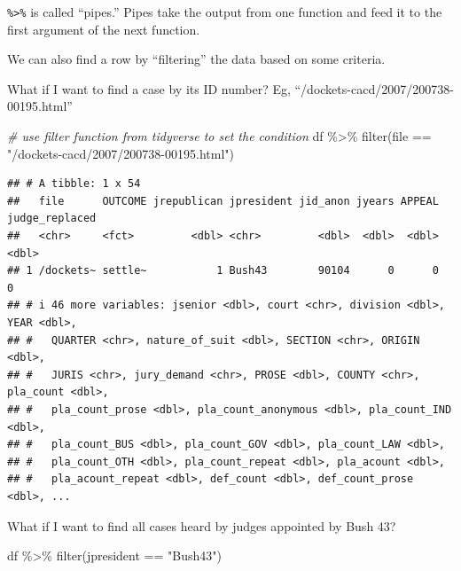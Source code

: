 \documentclass[
]{article}
\newenvironment{Shaded}{\begin{snugshade}}{\end{snugshade}}
\newcommand{\CommentTok}[1]{\textcolor[rgb]{0.56,0.35,0.01}{\textit{#1}}}
\newcommand{\FunctionTok}[1]{\textcolor[rgb]{0.00,0.00,0.00}{#1}}
\newcommand{\NormalTok}[1]{#1}
\newcommand{\SpecialCharTok}[1]{\textcolor[rgb]{0.00,0.00,0.00}{#1}}
\newcommand{\StringTok}[1]{\textcolor[rgb]{0.31,0.60,0.02}{#1}}
\begin{document}
\texttt{\%\textgreater{}\%} is called ``pipes.'' Pipes take the output
from one function and feed it to the first argument of the next
function.

We can also find a row by ``filtering'' the data based on some criteria.

What if I want to find a case by its ID number? Eg,
``/dockets-cacd/2007/200738-00195.html''

\begin{Shaded}
\begin{Highlighting}[]
\CommentTok{\# use filter function from tidyverse to set the condition }
\NormalTok{df }\SpecialCharTok{\%\textgreater{}\%} \FunctionTok{filter}\NormalTok{(file }\SpecialCharTok{==} \StringTok{"/dockets{-}cacd/2007/200738{-}00195.html"}\NormalTok{)}
\end{Highlighting}
\end{Shaded}

\begin{verbatim}
## # A tibble: 1 x 54
##   file      OUTCOME jrepublican jpresident jid_anon jyears APPEAL judge_replaced
##   <chr>     <fct>         <dbl> <chr>         <dbl>  <dbl>  <dbl>          <dbl>
## 1 /dockets~ settle~           1 Bush43        90104      0      0              0
## # i 46 more variables: jsenior <dbl>, court <chr>, division <dbl>, YEAR <dbl>,
## #   QUARTER <chr>, nature_of_suit <dbl>, SECTION <chr>, ORIGIN <dbl>,
## #   JURIS <chr>, jury_demand <chr>, PROSE <dbl>, COUNTY <chr>, pla_count <dbl>,
## #   pla_count_prose <dbl>, pla_count_anonymous <dbl>, pla_count_IND <dbl>,
## #   pla_count_BUS <dbl>, pla_count_GOV <dbl>, pla_count_LAW <dbl>,
## #   pla_count_OTH <dbl>, pla_count_repeat <dbl>, pla_acount <dbl>,
## #   pla_acount_repeat <dbl>, def_count <dbl>, def_count_prose <dbl>, ...
\end{verbatim}

What if I want to find all cases heard by judges appointed by Bush 43?

\begin{Shaded}
\begin{Highlighting}[]
\NormalTok{df }\SpecialCharTok{\%\textgreater{}\%} \FunctionTok{filter}\NormalTok{(jpresident }\SpecialCharTok{==} \StringTok{"Bush43"}\NormalTok{)}
\end{Highlighting}
\end{Shaded}
\end{document}
